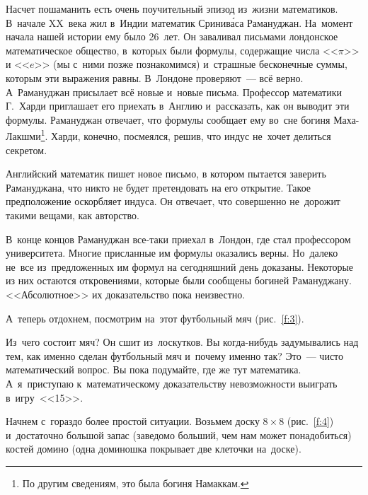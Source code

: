 Насчет пошаманить есть очень поучительный эпизод из~жизни математиков. В~начале XX~века жил в~Индии
математик Сринив\'аса Рамануджан. На~момент начала нашей истории ему было 26~лет. Он заваливал
письмами лондонское математическое общество, в~которых были формулы, содержащие числа <<$\pi$>> и <<$e$>>
(мы с~ними позже познакомимся) и~страшные бесконечные суммы, которым эти выражения равны. В~Лондоне
проверяют~--- всё верно. А~Рамануджан присылает всё новые и~новые письма. Профессор математики Г.~Харди приглашает его приехать
в~Англию и~рассказать, как он выводит эти формулы. Рамануджан
отвечает, что формулы сообщает ему во~сне богиня
Маха-Лакшми\footnote{По другим сведениям, это была богиня Намаккам.}. Харди, конечно, посмеялся, решив, что
индус не~хочет делиться секретом.

Английский математик пишет новое письмо, в котором пытается заверить Рамануджана, что никто
не будет претендовать на его открытие. Такое предположение оскорбляет индуса. Он отвечает,
что совершенно не~дорожит такими вещами, как авторство.

В~конце концов Рамануджан все-таки приехал в~Лондон, где стал профессором университета. Многие
присланные им формулы оказались верны. Но~далеко не~все из~предложенных им формул на сегодняшний день доказаны. Некоторые из них остаются
откровениями, которые были сообщены богиней Рамануджану.
 <<Абсолютное>> их доказательство пока неизвестно.

А~теперь отдохнем, посмотрим на~этот футбольный мяч (рис.~\ref{f:3}).


Из~чего состоит мяч? Он сшит из~лоскутков. Вы когда-нибудь задумывались над тем, как именно сделан
футбольный мяч и~почему именно так? Это~--- чисто математический вопрос. Вы пока подумайте, где же
тут математика. А~я~приступаю к~математическому доказательству невозможности выиграть в~игру~<<15>>.

Начнем с~гораздо более простой ситуации. Возьмем доску $8\times8$ (рис.~\ref{f:4}) и~достаточно большой запас (заведомо
больший, чем нам может понадобиться) костей домино (одна доминошка покрывает две клеточки
на~доске).



\pagebreak

